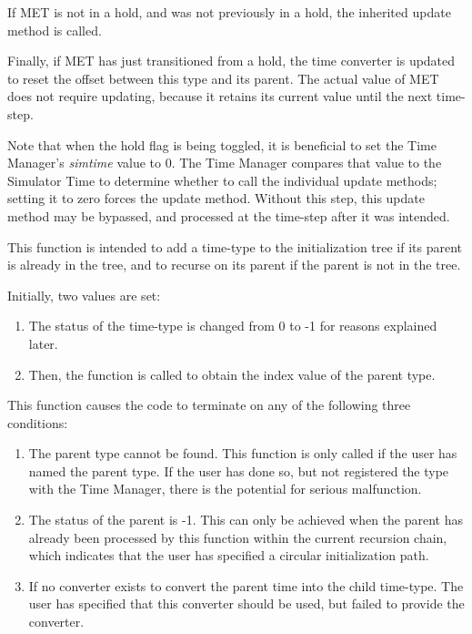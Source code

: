 {\begin{enumerate}
\begin{enumerate}
If MET is not in a hold, and was not previously in a hold, the inherited 
update method is called. 

Finally, if MET has just transitioned from a hold, the time converter is 
updated to reset the offset between this type and its parent.  The actual 
value of MET does not require updating, because it retains its current value 
until the next time-step.

Note that when the hold flag is being toggled, it is beneficial to set the 
Time Manager's \textit{simtime} value to 0. The Time Manager compares that 
value to the Simulator Time to determine whether to call the individual 
update methods; setting it to zero forces the update method.  Without this 
step, this update method may be bypassed, and processed at the time-step after 
it was intended.
\end{enumerate}

\label{ref:TimeStandard}


{\begin{enumerate}
This function is intended to add a time-type to the initialization tree
if its parent is already in the tree, and to recurse on its parent if
the parent is not in the tree.  

Initially, two values are set:


\begin{enumerate}
\item The status of the time-type is changed from 0 to -1 for reasons
explained later.  
\item Then, the  function is 
called to
obtain the index value of the parent type.  
\end{enumerate}



This function causes the code to terminate on any of the following three
conditions:


\begin{enumerate}
\item The parent type cannot be found.  This function is only called if
the user has named the parent type.  If the user has done so, but not
registered the type with the Time Manager, there is the potential for
serious malfunction.
\item The status of the parent is -1.  This can only be achieved when
the parent has already been processed by this function within the
current recursion chain, which indicates that the user has specified a
circular initialization path.
\item If no converter exists to convert the parent time into the child
time-type.  The user has specified that this converter should be used,
but failed to provide the converter.
\end{enumerate}


\end{enumerate}}
\end{enumerate}}

